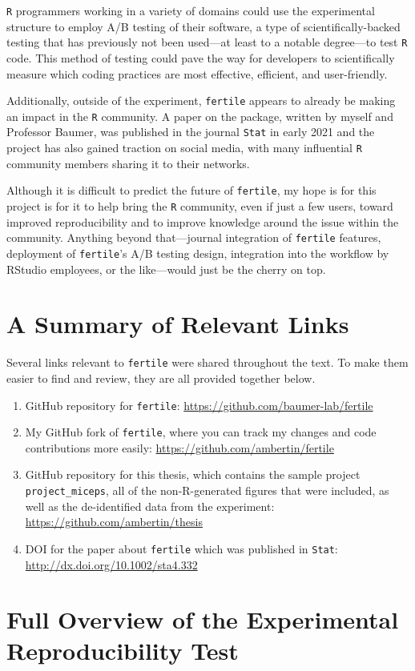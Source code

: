 \documentclass[12pt,twoside]{reedthesis}
\begin{document}
\texttt{R} programmers working in a variety of domains could use the experimental structure to employ A/B testing of their software, a type of scientifically-backed testing that has previously not been used---at least to a notable degree---to test \texttt{R} code. This method of testing could pave the way for developers to scientifically measure which coding practices are most effective, efficient, and user-friendly.

Additionally, outside of the experiment, \texttt{fertile} appears to already be making an impact in the \texttt{R} community. A paper on the package, written by myself and Professor Baumer, was published in the journal \texttt{Stat} in early 2021 and the project has also gained traction on social media, with many influential \texttt{R} community members sharing it to their networks.

Although it is difficult to predict the future of \texttt{fertile}, my hope is for this project is for it to help bring the \texttt{R} community, even if just a few users, toward improved reproducibility and to improve knowledge around the issue within the community. Anything beyond that---journal integration of \texttt{fertile} features, deployment of \texttt{fertile}'s A/B testing design, integration into the workflow by RStudio employees, or the like---would just be the cherry on top.

\appendix

\hypertarget{a-summary-of-relevant-links}{%
\chapter{A Summary of Relevant Links}\label{a-summary-of-relevant-links}}

Several links relevant to \texttt{fertile} were shared throughout the text. To make them easier to find and review, they are all provided together below.
\begin{enumerate}
\def\labelenumi{\arabic{enumi}.}
\item
  GitHub repository for \texttt{fertile}: \url{https://github.com/baumer-lab/fertile}
\item
  My GitHub fork of \texttt{fertile}, where you can track my changes and code contributions more easily: \url{https://github.com/ambertin/fertile}
\item
  GitHub repository for this thesis, which contains the sample project \texttt{project\_miceps}, all of the non-R-generated figures that were included, as well as the de-identified data from the experiment: \url{https://github.com/ambertin/thesis}
\item
  DOI for the paper about \texttt{fertile} which was published in \texttt{Stat}: \url{http://dx.doi.org/10.1002/sta4.332}
\end{enumerate}
\hypertarget{full-overview-of-the-experimental-reproducibility-test}{%
\chapter{Full Overview of the Experimental Reproducibility Test}\label{full-overview-of-the-experimental-reproducibility-test}}
\end{document}
